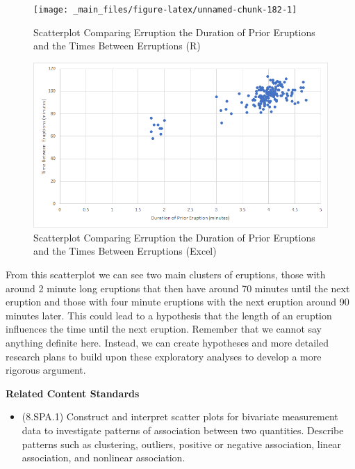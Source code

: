 \documentclass[
]{book}
\providecommand{\tightlist}{%
  \setlength{\itemsep}{0pt}\setlength{\parskip}{0pt}}
\newenvironment{standards}{}{}
\theoremstyle{definition}
\theoremstyle{definition}
\theoremstyle{definition}
\theoremstyle{definition}
\theoremstyle{remark}
\begin{document}
\begin{figure}

{\centering \texttt{[image: \_main\_files/figure-latex/unnamed-chunk-182-1]} 

}

\caption{Scatterplot Comparing Erruption the Duration of Prior Eruptions and the Times Between Erruptions (R)}\label{fig:unnamed-chunk-182}
\end{figure}

\begin{figure}

{\centering \includegraphics[width=0.9\linewidth]{data-examples/Old-Faithful/Eruption-Scatter-Excel} 

}

\caption{Scatterplot Comparing Erruption the Duration of Prior Eruptions and the Times Between Erruptions (Excel)}\label{fig:unnamed-chunk-183}
\end{figure}

From this scatterplot we can see two main clusters of eruptions, those with around 2 minute long eruptions that then have around 70 minutes until the next eruption and those with four minute eruptions with the next eruption around 90 minutes later. This could lead to a hypothesis that the length of an eruption influences the time until the next eruption. Remember that we cannot say anything definite here. Instead, we can create hypotheses and more detailed research plans to build upon these exploratory analyses to develop a more rigorous argument.

\begin{standards}

\begin{center}
\textbf{Related Content Standards}

\end{center}

\begin{itemize}
\tightlist
\item
  (8.SPA.1) Construct and interpret scatter plots for bivariate measurement data to investigate patterns of association between two quantities. Describe patterns such as clustering, outliers, positive or negative association, linear association, and nonlinear association.
\end{itemize}

\end{standards}
\end{document}
